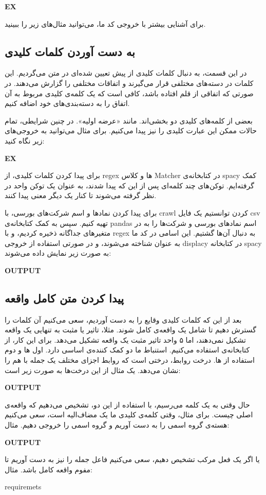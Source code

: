 \documentclass[a4paper,12pt]{article}
\begin{document}
\textbf{EX}

برای آشنایی بیشتر با خروجی کد ما، می‌توانید مثال‌های زیر را ببینید. 








\subsection*{به دست آوردن کلمات کلیدی}

در این قسمت، به دنبال کلمات کلیدی از پیش تعیین شده‌ای در متن می‌گردیم. این کلمات در 
دسته‌های مختلفی قرار می‌گیرند و اتفاقات مختلفی را گزارش می‌دهند. در صورتی که اتفاقی از 
قلم افتاده باشد، کافی است که یک کلمه‌ی کلیدی مربوط به آن اتفاق را به دسته‌بندی‌های خود 
اضافه کنیم. 

بعضی از کلمه‌های کلیدی دو بخشی‌اند. مانند «عرضه اولیه». در چنین شرایطی، تمام حالات ممکن این 
عبارت کلیدی را نیز پیدا می‌کنیم. برای مثال می‌توانید به خروجی‌های زیر نگاه کنید: 

\textbf{EX}


برای پیدا کردن کلمات کلیدی، از 
regex
ها و کلاس 
Matcher
در کتابخانه‌ی 
spacy
کمک گرفته‌ایم. توکن‌های چند کلمه‌ای پس از این که پیدا شدند، به عنوان یک توکن واحد در نظر 
گرفته می‌شوند تا کنار یک دیگر معنی پیدا کنند. 

برای پیدا کردن نماد‌ها و اسم شرکت‌های بورسی، با 
crawl
کردن توانستیم یک فایل 
csv
تهیه کنیم. سپس به کمک کتابخانه‌ی 
pandas
اسم نماد‌های بورسی و شرکت‌ها را به در متغیر‌های جداگانه ذخیره کردیم، و با 
regex
به دنبال آن‌ها گشتیم. این اسامی در کد ما به عنوان
شناخته می‌شوند، و در صورتی استفاده از خروجی
displacy
در کتابخانه
spacy
به صورت زیر نمایش داده می‌شوند: 


\textbf{OUTPUT}




\subsection*{پیدا کردن متن کامل واقعه}

بعد از این که کلمات کلیدی وقایع را به دست آوردیم،‌ سعی می‌کنیم آن کلمات را گسترش دهیم 
تا شامل یک واقعه‌ی کامل شوند. مثلا، تاثیر یا مثبت به تنهایی یک واقعه تشکیل نمی‌دهند، اما ۵ واحد تاثیر 
مثبت یک واقعه تشکیل می‌دهد. برای این کار، از کتابخانه‌ی
استفاده می‌کنیم. استنباط ما دو کمک کننده‌ی اساسی دارد. اول
ها
 و دوم استفاده از 
ها. 
درخت روابط، درختی است که روابط اجزای مختلف یک جمله با هم را نشان می‌دهد. یک مثال از این 
درخت‌ها به صورت زیر است: 

\textbf{OUTPUT}

حال وقتی به یک کلمه‌ می‌رسیم، با استفاده از این دو، تشخیص می‌دهیم که واقعه‌ی اصلی چیست. 
برای مثال، وقتی کلمه‌ی کلیدی ما یک مضاف‌الیه است، سعی می‌کنیم هسته‌ی گروه اسمی را به دست 
آوریم و گروه اسمی را خروجی دهیم. مثال: 


\textbf{OUTPUT}

یا اگر یک فعل مرکب تشخیص دهیم، سعی می‌کنیم فاعل جمله‌ را نیز به دست آوریم تا مفوم 
واقعه کامل باشد. مثال: 


requiremets
\end{document}
